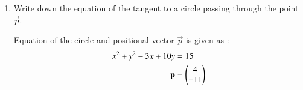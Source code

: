 \renewcommand{\theequation}{\theenumi}
\renewcommand{\thefigure}{\theenumi}
\begin{enumerate}[label=\thesubsection.\arabic*.,ref=\thesubsection.\theenumi]


\item Write down the equation of the tangent to a circle passing through the point $\vec{p}$. 

Equation of the circle and positional vector $\vec{p}$ is given as :
\begin{align}
    x^2+y^2-3x+10y&=15\label{eq:solutions/18/1/eq:0}\\
    \mathbf{p}&=\begin{pmatrix}4\\-11\end{pmatrix}
\end{align}
\solution

\end{enumerate}
